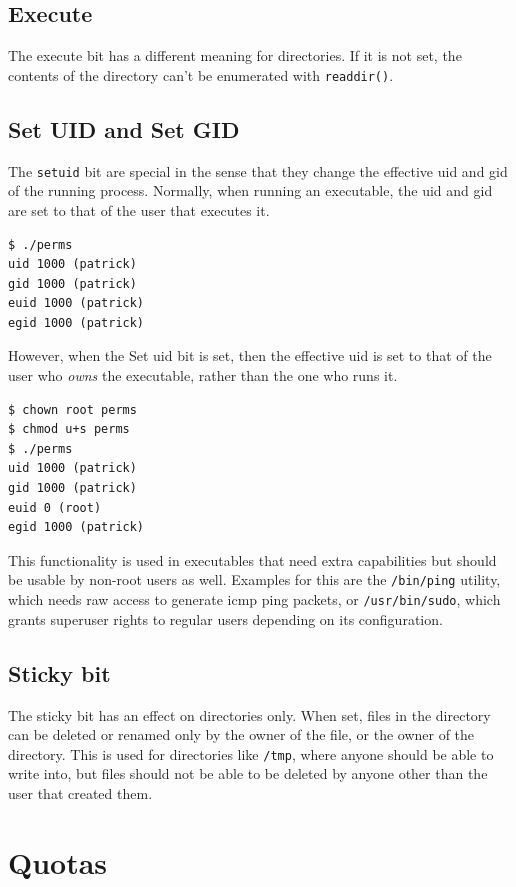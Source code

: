 \documentclass[a4paper]{article}
\begin{document}
\subsection{Execute}

The execute bit has a different meaning for directories. If it is not set, the contents of the directory can't be enumerated with \verb|readdir()|. 

\subsection{Set UID and Set GID}

The \verb|setuid| bit are special in the sense that they change the effective \gls{uid} and \gls{gid} of the running process. Normally, when running an executable, the \gls{uid} and \gls{gid} are set to that of the user that executes it.

\begin{verbatim}
$ ./perms
uid 1000 (patrick)
gid 1000 (patrick)
euid 1000 (patrick)
egid 1000 (patrick)  
\end{verbatim}
However, when the Set \gls{uid} bit is set, then the effective \gls{uid} is set to that of the user who \emph{owns} the executable, rather than the one who runs it.

\begin{verbatim}
$ chown root perms
$ chmod u+s perms
$ ./perms
uid 1000 (patrick)
gid 1000 (patrick)
euid 0 (root)
egid 1000 (patrick)  
\end{verbatim}
This functionality is used in executables that need extra capabilities but should be usable by non-root users as well. Examples for this are the \verb|/bin/ping| utility, which needs raw access to generate \gls{icmp} ping packets, or \verb|/usr/bin/sudo|, which grants superuser rights to regular users depending on its configuration.

\subsection{Sticky bit}

The sticky bit has an effect on directories only. When set, files in the directory can be deleted or renamed only by the owner of the file, or the owner of the directory. This is used for directories like \verb|/tmp|, where anyone should be able to write into, but files should not be able to be deleted by anyone other than the user that created them.

\section{Quotas}
\end{document}
